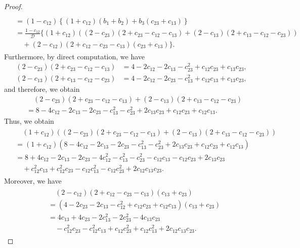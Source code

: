 \documentclass[reqno]{amsart}
\theoremstyle{plain}
\theoremstyle{definition}
\numberwithin{equation}{section}
\newcommand{\1}{\mathbbm{1}}
\begin{document}
\begin{proof}
\begin{align}
\begin{aligned}
\\
&=(1-c_{12})\left\{(1+c_{12})(b_1+b_2)+b_3(c_{23}+c_{13}) \right\}
\\
&=\frac{1-c_{12}}{\mathcal{D}}\{ (1+c_{12})\left( (2-c_{23})(2+c_{23}-c_{12}-c_{13})+(2-c_{13})(2+c_{13}-c_{12}-c_{23})\right)
\\
&\quad+(2-c_{12})(2+c_{12}-c_{23}-c_{13})(c_{23}+c_{13})  \}.
\end{aligned}
\end{align}
Furthermore, by direct computation, we have
\begin{align*}
(2-c_{23})(2+c_{23}-c_{12}-c_{13})&=4-2c_{12}-2c_{13}-c_{23}^2+c_{12}c_{23}+c_{13}c_{23},
\\
(2-c_{13})(2+c_{13}-c_{12}-c_{23})&=4-2c_{12}-2c_{23}-c_{13}^2+c_{12}c_{13}+c_{13}c_{23},
\end{align*}
and therefore, we obtain
\begin{align*}
&\quad (2-c_{23})(2+c_{23}-c_{12}-c_{13})+(2-c_{13})(2+c_{13}-c_{12}-c_{23})
\\
&=8-4c_{12}-2c_{13}-2c_{23}-c_{13}^2-c_{23}^2+2c_{13}c_{23}+c_{12}c_{23}+c_{12}c_{13}.
\end{align*}
Thus, we obtain
\begin{align}\label{turaikeisan1}
\begin{aligned}
&\quad (1+c_{12})\left( (2-c_{23})(2+c_{23}-c_{12}-c_{13})+(2-c_{13})(2+c_{13}-c_{12}-c_{23})\right)
\\
&=(1+c_{12})(8-4c_{12}-2c_{13}-2c_{23}-c_{13}^2-c_{23}^2+2c_{13}c_{23}+c_{12}c_{23}+c_{12}c_{13})
\\
&=8+4c_{12}-2c_{13}-2c_{23}-4c_{12}^2-c_{13}^2-c_{23}^2-c_{12}c_{13}-c_{12}c_{23}+2c_{13}c_{23}
\\
&\quad+c_{12}^2c_{13}+c_{12}^2c_{23}-c_{12}c_{13}^2-c_{12}c_{23}^2+2c_{12}c_{13}c_{23}.
\end{aligned}
\end{align}
Moreover, we have
\begin{align}\label{turaikeisan2}
\begin{aligned}
&\quad (2-c_{12})(2+c_{12}-c_{23}-c_{13})(c_{13}+c_{23})
\\
&=(4-2c_{23}-2c_{13}-c_{12}^2+c_{12}c_{23}+c_{12}c_{13})(c_{13}+c_{23})
\\
&=4c_{13}+4c_{23}-2c_{13}^2-2c_{23}^2-4c_{13}c_{23}
\\
&\quad-c_{12}^2c_{23}-c_{12}^2c_{13}+c_{12}c_{23}^2+c_{12}c_{13}^2+2c_{12}c_{13}c_{23}.
\end{aligned}
\end{align}

\end{proof}
\end{document}
